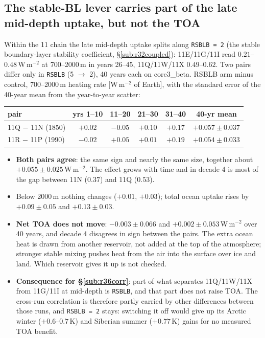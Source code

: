 \documentclass[10pt]{article}
\begin{document}
\subsection{The stable-BL lever carries part of the late mid-depth uptake, but not the TOA}\label{sub:r36rsblb}

Within the 11 chain the late mid-depth uptake splits along \texttt{RSBLB = 2} (the stable
boundary-layer stability coefficient, \S\ref{sub:r32coupled}): 11E/11G/11I read
$0.21$--$0.48$\,W\,m$^{-2}$ at 700--2000\,m in years 26--45, 11Q/11W/11X $0.49$--$0.62$. Two
pairs differ only in \texttt{RSBLB} (5 $\to$ 2), 40 years each on core3\_beta. RSBLB arm
minus control, 700--2000\,m heating rate [W\,m$^{-2}$ of Earth], with the standard error of the
40-year mean from the year-to-year scatter:

\begin{center}\small
\begin{tabular}{lccccc}
\toprule
pair & yrs 1--10 & 11--20 & 21--30 & 31--40 & 40-yr mean \\
\midrule
11Q $-$ 11N (1850) & $+0.02$ & $-0.05$ & $+0.10$ & $\mathbf{+0.17}$ & $+0.057\pm0.037$ \\
11R $-$ 11P (1990) & $-0.02$ & $+0.05$ & $+0.01$ & $\mathbf{+0.19}$ & $+0.054\pm0.033$ \\
\bottomrule
\end{tabular}
\end{center}

\begin{itemize}\itemsep2pt
\item \textbf{Both pairs agree}: the same sign and nearly the same size, together about
$+0.055\pm0.025$\,W\,m$^{-2}$. The effect grows with time and in decade 4 is most of the gap
between 11N ($0.37$) and 11Q ($0.53$).
\item Below 2000\,m nothing changes ($+0.01$, $+0.03$); total ocean uptake rises by
$+0.09\pm0.05$ and $+0.13\pm0.03$.
\item \textbf{Net TOA does not move}: $-0.003\pm0.066$ and $+0.002\pm0.053$\,W\,m$^{-2}$ over 40
years, and decade 4 disagrees in sign between the pairs. The extra ocean heat is drawn from
another reservoir, not added at the top of the atmosphere; stronger stable mixing pushes heat
from the air into the surface over ice and land. Which reservoir gives it up is not checked.
\item \textbf{Consequence for \S\ref{sub:r36corr}}: part of what separates 11Q/11W/11X from
11G/11I at mid-depth is \texttt{RSBLB}, and that part does not raise TOA. The cross-run
correlation is therefore partly carried by other differences between those runs, and
\texttt{RSBLB = 2} stays: switching it off would give up its Arctic winter
($+0.6$--$0.7$\,K) and Siberian summer ($+0.77$\,K) gains for no measured TOA benefit.
\end{itemize}
\end{document}
